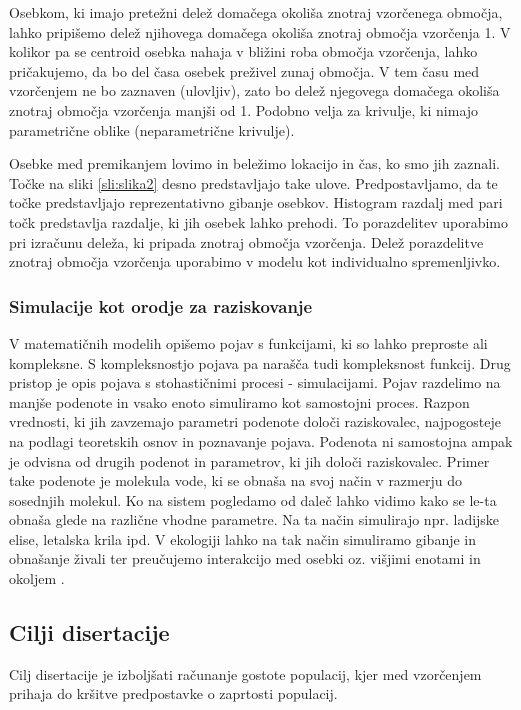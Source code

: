 Osebkom, ki imajo pretežni delež domačega okoliša znotraj vzorčenega območja, lahko pripišemo delež njihovega domačega okoliša znotraj območja vzorčenja 1. V kolikor pa se centroid osebka nahaja v bližini roba območja vzorčenja, lahko pričakujemo, da bo del časa osebek preživel zunaj območja. V tem času med vzorčenjem ne bo zaznaven (ulovljiv), zato bo delež njegovega domačega okoliša znotraj območja vzorčenja manjši od 1. Podobno velja za krivulje, ki nimajo parametrične oblike (neparametrične krivulje).

Osebke med premikanjem lovimo in beležimo lokacijo in čas, ko smo jih zaznali. Točke na sliki \ref{sli:slika2} desno predstavljajo take ulove. Predpostavljamo, da te točke predstavljajo reprezentativno gibanje osebkov. Histogram razdalj med pari točk predstavlja razdalje, ki jih osebek lahko prehodi. To porazdelitev uporabimo pri izračunu deleža, ki pripada znotraj območja vzorčenja. Delež porazdelitve znotraj območja vzorčenja uporabimo v modelu kot individualno spremenljivko.

\subsubsection{Simulacije kot orodje za raziskovanje}
V matematičnih modelih opišemo pojav s funkcijami, ki so lahko preproste ali kompleksne. S kompleksnostjo pojava pa narašča tudi kompleksnost funkcij. Drug pristop je opis pojava s stohastičnimi procesi - simulacijami. Pojav razdelimo na manjše podenote in vsako enoto simuliramo kot samostojni proces. Razpon vrednosti, ki jih zavzemajo parametri podenote določi raziskovalec, najpogosteje na podlagi teoretskih osnov in poznavanje pojava. Podenota ni samostojna ampak je odvisna od drugih podenot in parametrov, ki jih določi raziskovalec. Primer take podenote je molekula vode, ki se obnaša na svoj način v razmerju do sosednjih molekul. Ko na sistem pogledamo od daleč lahko vidimo kako se le-ta obnaša glede na različne vhodne parametre. Na ta način simulirajo npr. ladijske elise, letalska krila ipd. V ekologiji lahko na tak način simuliramo gibanje in obnašanje živali ter preučujemo interakcijo med osebki oz. višjimi enotami in okoljem \citep{bolker_ecological_2008}.

\subsection{Cilji disertacije}
Cilj disertacije je izboljšati računanje gostote populacij, kjer med vzorčenjem prihaja do kršitve predpostavke o zaprtosti populacij.

